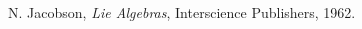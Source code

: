 \documentclass{amsart}
\begin{document}
\begin{thebibliography}{99}
\newcommand{\au}[1]{{#1},}
\newcommand{\rawti}[1]{\textit{#1}}
\newcommand{\ti}[1]{\rawti{#1},}
\newcommand{\jo}[1]{{#1}}
\newcommand{\vo}[1]{\textbf{#1}}
\newcommand{\yr}[1]{(#1),}
\newcommand{\pp}[1]{#1.}
\newcommand{\ppc}[1]{#1,}
\newcommand{\pps}[1]{#1;}
\newcommand{\bk}[1]{{#1},}
\newcommand{\inbk}[1]{in{#1}}
\newcommand{\plain}[1]{#1}
\newcommand{\xxx}[1]{{arXiv:#1}}


\au{N. Jacobson} \ti{Lie Algebras} \pp{Interscience Publishers,
1962}


\end{thebibliography}
\end{document}
